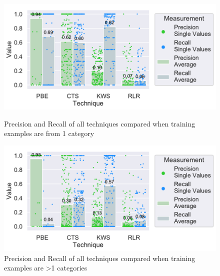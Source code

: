 \documentclass[\myrootdir/main.tex]{subfiles}
\begin{document}
\begin{figure}[htbp]
	\centering
	\begin{minipage}{0.45\textwidth}
		\centering
		\includegraphics[width=\textwidth, clip]{img/big-study/recall-precision-singlecategory-all.pdf}
		\caption{Precision and Recall of all techniques compared when training examples are from 1 category}
		\label{fig:recall-precision-singlecategory-all}
	\end{minipage}\hfill
	\begin{minipage}{0.45\textwidth}
		\centering
		\includegraphics[width=\textwidth, clip]{img/big-study/recall-precision-multicategory-all.pdf}
		\caption{Precision and Recall of all techniques compared when training examples are >1 categories}
		\label{fig:recall-precision-multicategory-all}
	\end{minipage}
\end{figure}


\end{document}
